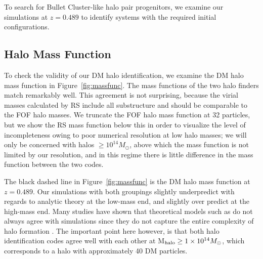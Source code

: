 \documentclass[useAMS, usenatbib]{mn2e}
\newcommand{\Msun}{M_{\odot}}
\begin{document}
To search for Bullet Cluster-like halo pair progenitors, 
we examine our simulations at $z=0.489$ 
to identify systems with the required initial configurations.

\subsection{Halo Mass Function}
 \label{sec:massfunc}

To check the validity of our DM halo identification,  we examine
the DM halo mass function in Figure~\ref{fig:massfunc}.  The mass
functions of the two halo finders match remarkably well.  This
agreement is not surprising, because the virial masses calculated
by RS include all substructure and should be comparable to the FOF
halo masses.  We truncate the FOF halo mass function at 32 particles,
but we show the RS mass function below this in order to visualize
the level of incompleteness owing to poor numerical resolution at
low halo masses; we will only be concerned with halos 
$\geq10^{14}M_\odot$, above which the mass function is not limited by
our resolution, and in this regime there is little difference in
the mass function between the two codes.

The black dashed line in Figure~\ref{fig:massfunc} is the \citet{ST99}
DM halo mass function at $z=0.489$.  Our simulations with both
groupings slightly underpredict with regards to analytic theory at
the low-mass end, and slightly over predict at the high-mass end.
Many studies have shown that theoretical models such as \citet{ST99}
do not always agree with simulations since they do not capture the
entire complexity of halo formation \citep[i.e.
][]{Jenkins01,Tinker08,Robertson09,Courtin11}.  The important point
here however, is that both halo identification codes agree well
with each other at M$_{\rm halo}\geq1\times10^{14}\Msun$, which
corresponds to a halo with approximately 40 DM particles.
\end{document}
